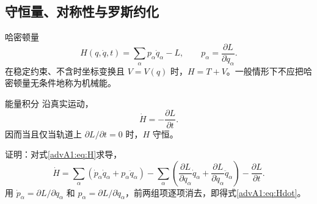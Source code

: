 \subsection{守恒量、对称性与罗斯约化}

\begin{advdefinition}{哈密顿量}\label{advA1:def:hamiltonian}
\begin{equation}\label{advA1:eq:H}
 H(q,\dot q,t)=\sum_\alpha p_\alpha\dot q_\alpha-L,
 \qquad p_\alpha=\frac{\partial L}{\partial\dot q_\alpha}.
\end{equation}
在稳定约束、不含时坐标变换且 $V=V(q)$ 时，$H=T+V$。一般情形下不应把哈密顿量无条件地称为机械能。
\end{advdefinition}

\begin{advtheorem}{能量积分}\label{advA1:thm:energy}
沿真实运动，
\begin{equation}\label{advA1:eq:Hdot}
 \dot H=-\frac{\partial L}{\partial t}.
\end{equation}
因而当且仅当轨道上 $\partial L/\partial t=0$ 时，$H$ 守恒。
\end{advtheorem}
证明：对式\eqref{advA1:eq:H}求导，
\[
 \dot H=\sum_\alpha(\dot p_\alpha\dot q_\alpha+p_\alpha\ddot q_\alpha)
 -\sum_\alpha\left(\frac{\partial L}{\partial q_\alpha}\dot q_\alpha
 +\frac{\partial L}{\partial\dot q_\alpha}\ddot q_\alpha\right)
 -\frac{\partial L}{\partial t}.
\]
用 $\dot p_\alpha=\partial L/\partial q_\alpha$ 和
$p_\alpha=\partial L/\partial\dot q_\alpha$，前两组项逐项消去，即得式\eqref{advA1:eq:Hdot}。

